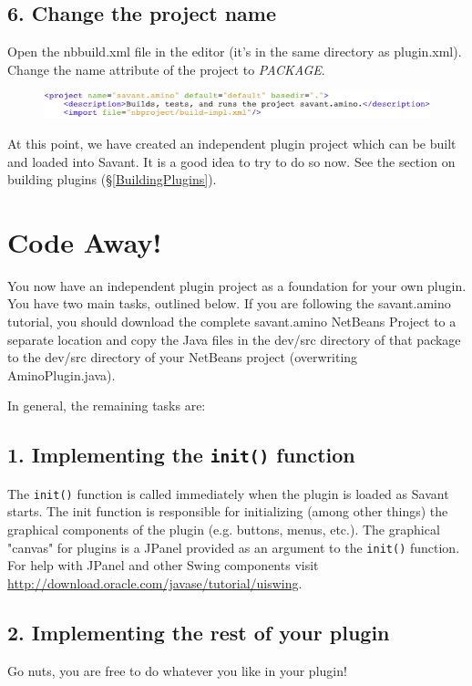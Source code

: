 \documentclass[times,11pt]{report}
\begin{document}
\subsection*{6. Change the project name}
Open the nbbuild.xml file in the editor (it's in the same directory as plugin.xml). Change the name attribute of the project to \textit{PACKAGE}.
\begin{figure}[h!]
\begin{center}
\includegraphics[type=png,ext=.png,read=.png,width=16cm]{images/RenameProject}
\end{center}
\end{figure}

At this point, we have created an independent plugin project which can be built and loaded into Savant. It is a good idea to try to do so now. See the section on building plugins (\S\ref{BuildingPlugins}).

\section{Code Away!}
You now have an independent plugin project as a foundation for your own plugin. You have two main tasks, outlined below. If you are following the savant.amino tutorial, you should download the complete savant.amino NetBeans Project to a separate location and copy the Java files in the dev/src directory of that package to the dev/src directory of your NetBeans project (overwriting AminoPlugin.java).

In general, the remaining tasks are:

\subsection*{1. Implementing the {\tt init()} function}
The {\tt init()} function is called immediately when the plugin is loaded as Savant starts. The init function is responsible for initializing (among other things) the graphical components of the plugin (e.g. buttons, menus, etc.). The graphical "canvas" for plugins is a JPanel provided as an argument to the {\tt init()} function. For help with JPanel and other Swing components visit \href{http://download.oracle.com/javase/tutorial/uiswing}{http://download.oracle.com/javase/tutorial/uiswing}.

\subsection*{2. Implementing the rest of your plugin}
Go nuts, you are free to do whatever you like in your plugin!
\end{document}
